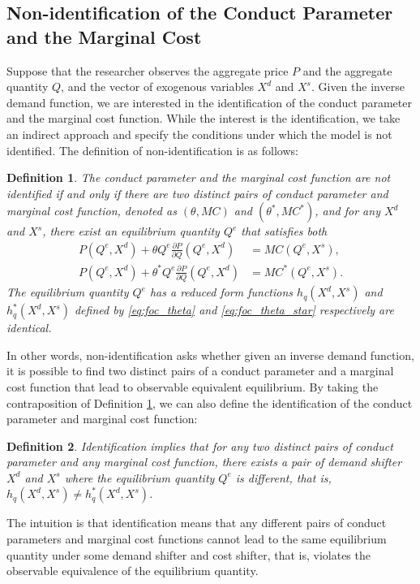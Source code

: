 \documentclass[11pt, a4paper]{article}
\newtheorem{definition}{Definition}
\theoremstyle{remark}
\begin{document}
\subsection{Non-identification of the Conduct Parameter and the Marginal Cost}\label{sec:definition_identification}
Suppose that the researcher observes the aggregate price $P$ and the aggregate quantity $Q$, and the vector of exogenous variables $X^{d}$ and $X^{s}$.
Given the inverse demand function, we are interested in the identification of the conduct parameter and the marginal cost function.
While the interest is the identification, we take an indirect approach and specify the conditions under which the model is not identified.
The definition of non-identification is as follows:
\begin{definition}\label{definition:non_identification}
    The conduct parameter and the marginal cost function are not identified if and only if 
    there are two distinct pairs of conduct parameter and marginal cost function, denoted as $(\theta, MC)$ and $(\theta^{*}, MC^{*})$, and for any $X^{d}$ and $X^{s}$, there exist an equilibrium quantity $Q^e$ that satisfies both
    \begin{align}
    P(Q^e, X^{d}) + \theta Q^e\frac{\partial P}{\partial Q}(Q^e, X^{d}) & = MC(Q^e, X^{s}) ,  \label{eq:foc_theta}\\
    P(Q^e, X^{d}) + \theta^{*} Q^e\frac{\partial P}{\partial Q}(Q^e, X^{d}) & = MC^{*}(Q^e, X^{s}).\label{eq:foc_theta_star}
    \end{align}
    The equilibrium quantity $Q^e$ has a reduced form functions $h_q(X^{d}, X^{s})$ and $h_q^{*}(X^{d}, X^{s})$ defined by \eqref{eq:foc_theta} and \eqref{eq:foc_theta_star} respectively are identical.
\end{definition}
In other words, non-identification asks whether given an inverse demand function, it is possible to find two distinct pairs of a conduct parameter and a marginal cost function that lead to observable equivalent equilibrium.
By taking the contraposition of Definition \ref{definition:non_identification}, we can also define the identification of the conduct parameter and marginal cost function:
\begin{definition}\label{definition:identification}
    Identification implies that for any two distinct pairs of conduct parameter and any marginal cost function, there exists a pair of demand shifter $X^{d}$ and $X^{s}$ where the equilibrium quantity $Q^e$ is different, that is, $h_q(X^{d}, X^{s}) \ne h_q^{*}(X^{d}, X^{s})$.
\end{definition}
The intuition is that identification means that any different pairs of conduct parameters and marginal cost functions cannot lead to the same equilibrium quantity under some demand shifter and cost shifter, that is, violates the observable equivalence of the equilibrium quantity.
\end{document}
